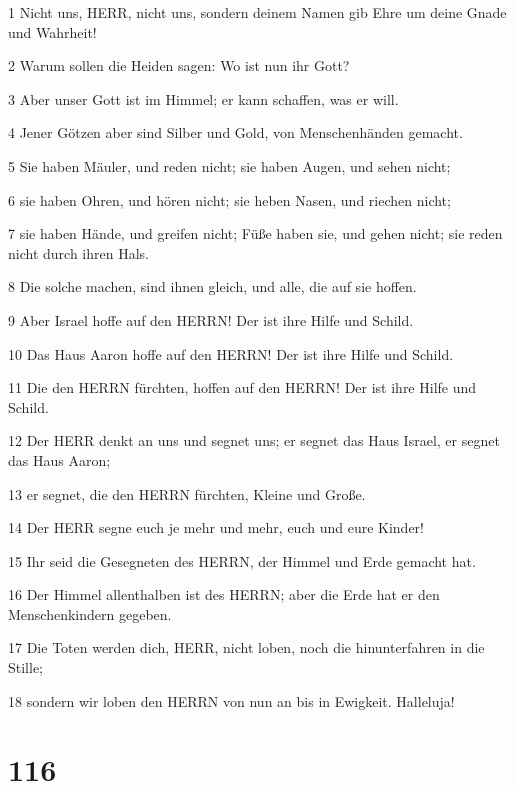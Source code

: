 \par 1 Nicht uns, HERR, nicht uns, sondern deinem Namen gib Ehre um deine Gnade und Wahrheit!
\par 2 Warum sollen die Heiden sagen: Wo ist nun ihr Gott?
\par 3 Aber unser Gott ist im Himmel; er kann schaffen, was er will.
\par 4 Jener Götzen aber sind Silber und Gold, von Menschenhänden gemacht.
\par 5 Sie haben Mäuler, und reden nicht; sie haben Augen, und sehen nicht;
\par 6 sie haben Ohren, und hören nicht; sie heben Nasen, und riechen nicht;
\par 7 sie haben Hände, und greifen nicht; Füße haben sie, und gehen nicht; sie reden nicht durch ihren Hals.
\par 8 Die solche machen, sind ihnen gleich, und alle, die auf sie hoffen.
\par 9 Aber Israel hoffe auf den HERRN! Der ist ihre Hilfe und Schild.
\par 10 Das Haus Aaron hoffe auf den HERRN! Der ist ihre Hilfe und Schild.
\par 11 Die den HERRN fürchten, hoffen auf den HERRN! Der ist ihre Hilfe und Schild.
\par 12 Der HERR denkt an uns und segnet uns; er segnet das Haus Israel, er segnet das Haus Aaron;
\par 13 er segnet, die den HERRN fürchten, Kleine und Große.
\par 14 Der HERR segne euch je mehr und mehr, euch und eure Kinder!
\par 15 Ihr seid die Gesegneten des HERRN, der Himmel und Erde gemacht hat.
\par 16 Der Himmel allenthalben ist des HERRN; aber die Erde hat er den Menschenkindern gegeben.
\par 17 Die Toten werden dich, HERR, nicht loben, noch die hinunterfahren in die Stille;
\par 18 sondern wir loben den HERRN von nun an bis in Ewigkeit. Halleluja!

\chapter{116}

